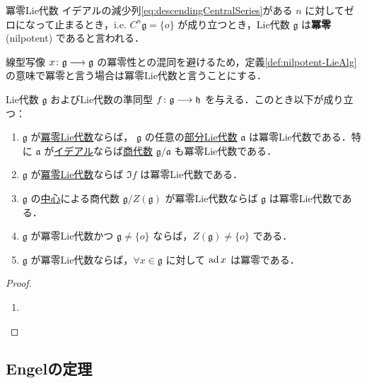 \documentclass[rep_main]{subfiles}
\begin{document}
\begin{mydef}[label=def:nilpotent-LieAlg]{冪零Lie代数}
    イデアルの減少列\eqref{eq:descendingCentralSeries}がある $n$ に対してゼロになって止まるとき，i.e. $C^n \mathfrak{g} = \{o\}$ が成り立つとき，Lie代数 $\mathfrak{g}$ は\textbf{冪零} (nilpotent) であると言われる．
\end{mydef}

\begin{marker}
    線型写像 $x \colon \mathfrak{g} \longrightarrow \mathfrak{g}$ の冪零性との混同を避けるため，定義\ref{def:nilpotent-LieAlg}の意味で冪零と言う場合は冪零Lie代数と言うことにする．
\end{marker}

\begin{myprop}[label=prop:nilpo-basic]{}
    Lie代数 $\mathfrak{g}$ およびLie代数の準同型 $f \colon \mathfrak{g} \longrightarrow \mathfrak{h}$ を与える．このとき以下が成り立つ：
    \begin{enumerate}
        \item $\mathfrak{g}$ が\hyperref[def:nilpotent-LieAlg]{冪零Lie代数}ならば，
        $\mathfrak{g}$ の任意の\hyperref[def:subLieAlg]{部分Lie代数} $\mathfrak{a}$ は冪零Lie代数である．特に $\mathfrak{a}$ が\hyperref[def:ideal-LieAlg]{イデアル}ならば\hyperref[def:quotient-LieAlg]{商代数} $\mathfrak{g} / \mathfrak{a}$ も冪零Lie代数である．
        \item $\mathfrak{g}$ が\hyperref[def:nilpotent-LieAlg]{冪零Lie代数}ならば $\Im f$ は冪零Lie代数である．
        \item $\mathfrak{g}$ の\hyperref[def:center-LieAlg]{中心}による商代数 $\mathfrak{g} / Z (\mathfrak{g})$ が冪零Lie代数ならば $\mathfrak{g}$ は冪零Lie代数である．
        \item $\mathfrak{g}$ が冪零Lie代数かつ $\mathfrak{g} \neq \{o\}$ ならば，$Z (\mathfrak{g}) \neq \{o\}$ である．
        \item $\mathfrak{g}$ が冪零Lie代数ならば，$\forall x \in \mathfrak{g}$ に対して $\operatorname{ad} x$ は冪零である．
    \end{enumerate}
\end{myprop}

\begin{proof}
    \begin{enumerate}
        \item 
    \end{enumerate}
\end{proof}

\subsection{Engelの定理}
\end{document}
